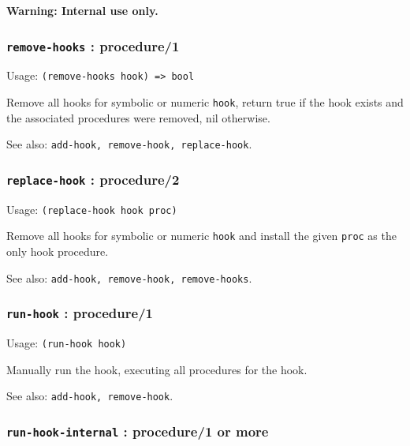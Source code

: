 \documentclass[
]{article}
\newcommand{\passthrough}[1]{#1}
\begin{document}
\textbf{Warning: Internal use only.}

\hypertarget{remove-hooks-procedure1}{%
\subsubsection{\texorpdfstring{\texttt{remove-hooks} :
procedure/1}{remove-hooks : procedure/1}}\label{remove-hooks-procedure1}}

Usage: \passthrough{\lstinline!(remove-hooks hook) => bool!}

Remove all hooks for symbolic or numeric \passthrough{\lstinline!hook!},
return true if the hook exists and the associated procedures were
removed, nil otherwise.

See also: \passthrough{\lstinline!add-hook, remove-hook, replace-hook!}.

\hypertarget{replace-hook-procedure2}{%
\subsubsection{\texorpdfstring{\texttt{replace-hook} :
procedure/2}{replace-hook : procedure/2}}\label{replace-hook-procedure2}}

Usage: \passthrough{\lstinline!(replace-hook hook proc)!}

Remove all hooks for symbolic or numeric \passthrough{\lstinline!hook!}
and install the given \passthrough{\lstinline!proc!} as the only hook
procedure.

See also: \passthrough{\lstinline!add-hook, remove-hook, remove-hooks!}.

\hypertarget{run-hook-procedure1}{%
\subsubsection{\texorpdfstring{\texttt{run-hook} :
procedure/1}{run-hook : procedure/1}}\label{run-hook-procedure1}}

Usage: \passthrough{\lstinline!(run-hook hook)!}

Manually run the hook, executing all procedures for the hook.

See also: \passthrough{\lstinline!add-hook, remove-hook!}.

\hypertarget{run-hook-internal-procedure1-or-more}{%
\subsubsection{\texorpdfstring{\texttt{run-hook-internal} : procedure/1
or
more}{run-hook-internal : procedure/1 or more}}\label{run-hook-internal-procedure1-or-more}}
\end{document}
